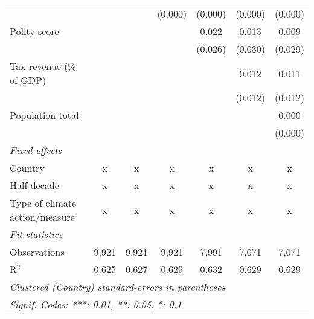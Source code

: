 \begin{tabular}{lcccccc}
                                                                                              &         &               & (0.000)        & (0.000)        & (0.000)        & (0.000)\\   
   Polity score                                                                               &         &               &                & 0.022          & 0.013          & 0.009\\   
                                                                                              &         &               &                & (0.026)        & (0.030)        & (0.029)\\   
   Tax revenue (\% of GDP)                                                                    &         &               &                &                & 0.012          & 0.011\\   
                                                                                              &         &               &                &                & (0.012)        & (0.012)\\   
   Population total                                                                           &         &               &                &                &                & 0.000\\   
                                                                                              &         &               &                &                &                & (0.000)\\   
   \emph{Fixed effects}\\
   Country                                                                                    & x       & x             & x              & x              & x              & x\\  
   Half decade                                                                                & x       & x             & x              & x              & x              & x\\  
   Type of climate action/measure                                                             & x       & x             & x              & x              & x              & x\\  
   \midrule \emph{Fit statistics}\\
   Observations                                                                               & 9,921   & 9,921         & 9,921          & 7,991          & 7,071          & 7,071\\  
   R$^2$                                                                                      & 0.625   & 0.627         & 0.629          & 0.632          & 0.629          & 0.629\\  
   \midrule
   \multicolumn{7}{l}{\emph{Clustered (Country) standard-errors in parentheses}}\\
   \multicolumn{7}{l}{\emph{Signif. Codes: ***: 0.01, **: 0.05, *: 0.1}}\\
\end{tabular}
\par\endgroup


